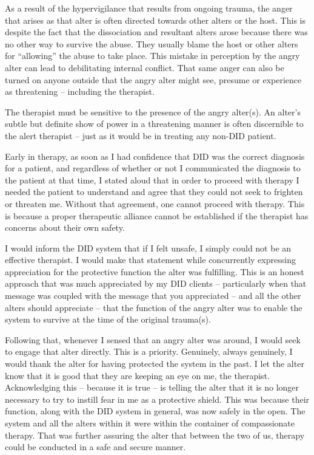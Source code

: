\documentclass[]{book}
\begin{document}
As a result of the hypervigilance that results from ongoing trauma, the anger that arises as that alter is often directed towards other alters or the host. This is despite the fact that the dissociation and resultant alters arose because there was no other way to survive the abuse. They usually blame the host or other alters for ``allowing'' the abuse to take place. This mistake in perception by the angry alter can lead to debilitating internal conflict. That same anger can also be turned on anyone outside that the angry alter might see, presume or experience as threatening -- including the therapist.

The therapist must be sensitive to the presence of the angry alter(s). An alter's subtle but definite show of power in a threatening manner is often discernible to the alert therapist -- just as it would be in treating any non-DID patient.

Early in therapy, as soon as I had confidence that DID was the correct diagnosis for a patient, and regardless of whether or not I communicated the diagnosis to the patient at that time, I stated aloud that in order to proceed with therapy I needed the patient to understand and agree that they could not seek to frighten or threaten me. Without that agreement, one cannot proceed with therapy. This is because a proper therapeutic alliance cannot be established if the therapist has concerns about their own safety.

I would inform the DID system that if I felt unsafe, I simply could not be an effective therapist. I would make that statement while concurrently expressing appreciation for the protective function the alter was fulfilling. This is an honest approach that was much appreciated by my DID clients -- particularly when that message was coupled with the message that you appreciated -- and all the other alters should appreciate -- that the function of the angry alter was to enable the system to survive at the time of the original trauma(s).

Following that, whenever I sensed that an angry alter was around, I would seek to engage that alter directly. This is a priority. Genuinely, always genuinely, I would thank the alter for having protected the system in the past. I let the alter know that it is good that they are keeping an eye on me, the therapist. Acknowledging this -- because it is true -- is telling the alter that it is no longer necessary to try to instill fear in me as a protective shield. This was because their function, along with the DID system in general, was now safely in the open. The system and all the alters within it were within the container of compassionate therapy. That was further assuring the alter that between the two of us, therapy could be conducted in a safe and secure manner.
\end{document}
